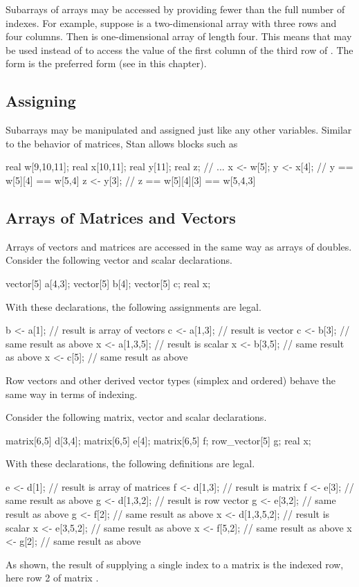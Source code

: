 Subarrays of arrays may be accessed by providing fewer than the full
number of indexes.  For example, suppose  is a two-dimensional
array with three rows and four columns.  Then  is
one-dimensional array of length four.  This means that 
may be used instead of  to access the value of the first
column of the third row of .  The form  is the
preferred form (see  in this chapter).

\subsection{Assigning}

Subarrays may be manipulated and assigned just like any other
variables.  Similar to the behavior of matrices, Stan allows blocks
such as
%
\begin{stancode}
real w[9,10,11];
real x[10,11];
real y[11];
real z;
// ...
x <- w[5];
y <- x[4];  // y == w[5][4] == w[5,4]
z <- y[3];  // z == w[5][4][3] == w[5,4,3]
\end{stancode}
%


\subsection{Arrays of Matrices and Vectors}

Arrays of vectors and matrices are accessed in the same way as arrays
of doubles.  Consider the following vector and scalar declarations.
%
\begin{stancode}
vector[5] a[4,3];
vector[5] b[4];
vector[5] c;
real x;
\end{stancode}
%
With these declarations, the following assignments are legal.
%
\begin{stancode}
b <- a[1];      // result is array of vectors
c <- a[1,3];    // result is vector
c <- b[3];      //   same result as above
x <- a[1,3,5];  // result is scalar
x <- b[3,5];    //   same result as above
x <- c[5];      //   same result as above
\end{stancode}
%
Row vectors and other derived vector types (simplex and ordered)
behave the same way in terms of indexing.

Consider the following matrix, vector and scalar declarations.
%
\begin{stancode}
matrix[6,5] d[3,4];
matrix[6,5] e[4];
matrix[6,5] f;
row_vector[5] g;
real x;
\end{stancode}
%
With these declarations, the following definitions are legal.
%
\begin{stancode}
e <- d[1];        // result is array of matrices
f <- d[1,3];      // result is matrix
f <- e[3];        //   same result as above
g <- d[1,3,2];    // result is row vector
g <- e[3,2];      //   same result as above
g <- f[2];        //   same result as above
x <- d[1,3,5,2];  // result is scalar
x <- e[3,5,2];    //   same result as above
x <- f[5,2];      //   same result as above
x <- g[2];        //   same result as above
\end{stancode}
%
As shown, the result  of supplying a single index to a
matrix is the indexed row, here row 2 of matrix .


